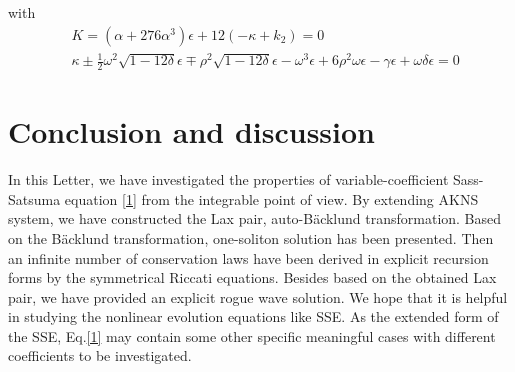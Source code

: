 \documentclass[12pt]{article}
\begin{document}
with
\begin{align}
  & K = (\alpha+276\alpha^{3})\epsilon+12(-\kappa+k_{2}) = 0 \\
  & \kappa \pm \frac{1}{2}\omega^{2}\sqrt{1-12\delta}\epsilon \mp \rho^{2}\sqrt{1-12\delta}\epsilon - \omega^{3}\epsilon + 6\rho^{2}\omega\epsilon - \gamma\epsilon + \omega\delta\epsilon = 0
\end{align}


\section{Conclusion and discussion}
In this Letter, we have investigated the properties of variable-coefficient Sass-Satsuma equation \eqref{1} from the integrable point of view. By extending AKNS system, we have constructed the Lax pair, auto-B\"acklund transformation. Based on the B\"acklund transformation, one-soliton solution has been presented. Then an infinite number of conservation laws have been derived in explicit recursion forms by the symmetrical Riccati equations. Besides based on the obtained Lax pair, we have provided an explicit rogue wave solution. We hope that it is helpful in studying the nonlinear evolution equations like SSE. As the extended form of the SSE, Eq.\eqref{1} may contain some other specific meaningful cases with different coefficients to be investigated.

\small


\end{document}

